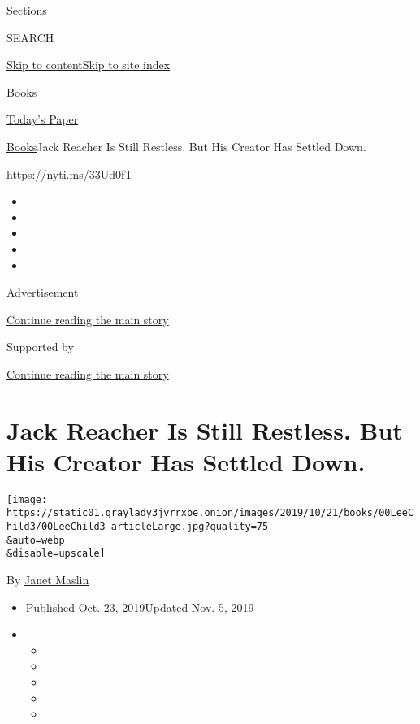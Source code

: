 Sections

SEARCH

\protect\hyperlink{site-content}{Skip to
content}\protect\hyperlink{site-index}{Skip to site index}

\href{https://www.nytimes3xbfgragh.onion/section/books}{Books}

\href{https://myaccount.nytimes3xbfgragh.onion/auth/login?response_type=cookie\&client_id=vi}{}

\href{https://www.nytimes3xbfgragh.onion/section/todayspaper}{Today's
Paper}

\href{/section/books}{Books}\textbar{}Jack Reacher Is Still Restless.
But His Creator Has Settled Down.

\url{https://nyti.ms/33Ud0fT}

\begin{itemize}
\item
\item
\item
\item
\item
\end{itemize}

Advertisement

\protect\hyperlink{after-top}{Continue reading the main story}

Supported by

\protect\hyperlink{after-sponsor}{Continue reading the main story}

\hypertarget{jack-reacher-is-still-restless-but-his-creator-has-settled-down}{%
\section{Jack Reacher Is Still Restless. But His Creator Has Settled
Down.}\label{jack-reacher-is-still-restless-but-his-creator-has-settled-down}}

\texttt{[image: https://static01.graylady3jvrrxbe.onion/images/2019/10/21/books/00LeeChild3/00LeeChild3-articleLarge.jpg?quality=75\\\&auto=webp\\\&disable=upscale]}

By \href{https://www.nytimes3xbfgragh.onion/by/janet-maslin}{Janet
Maslin}

\begin{itemize}
\item
  Published Oct. 23, 2019Updated Nov. 5, 2019
\item
  \begin{itemize}
  \item
  \item
  \item
  \item
  \item
  \end{itemize}
\end{itemize}

